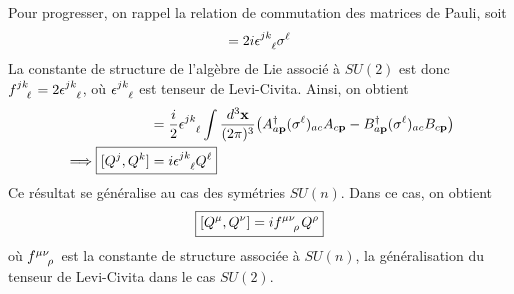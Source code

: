 \documentclass{article}
\numberwithin{equation}{section}
\begin{document}
Pour  progresser, on rappel la relation de commutation des matrices de Pauli, soit
\begin{equation}
        [\sigma^{j}, \sigma^{k}] = 2i \epsilon\indices{^{jk}_{\ell}} \sigma^{\ell}
\end{equation} 
La constante de structure de l'algèbre de Lie associé à $SU(2)$ est donc $f\indices{^{jk}_{\ell}} = 2 \epsilon\indices{^{jk}_{\ell}}$, où $\epsilon\indices{^{jk}_{\ell}}$ est tenseur de Levi-Civita. 
Ainsi, on obtient
\begin{align*}
        [Q^{j}, Q^{k}]        
&= \frac{i}{2}\epsilon\indices{^{jk}_{\ell}}\int \frac{d^{3}\mathbf{x}}{(2\pi)^{3}} 
\big( A^{\dagger}_{a\mathbf{p}} (\sigma^{\ell})_{ac} A_{c \mathbf{p}} 
- B^{\dagger}_{a\mathbf{p}} (\sigma^{\ell})_{ac} B_{c \mathbf{p}} 
\big) \\
        \implies \Aboxed{[Q^{j}, Q^{k}] &= i \epsilon\indices{^{jk}_{\ell}}Q^{\ell}}
\end{align*}
Ce résultat se généralise au cas des symétries $SU(n)$. Dans ce cas, on obtient
\begin{equation}
        \boxed{ [Q^{\mu}, Q^{\nu}] = if\indices{^{\mu \nu}_{\rho}}Q^{\rho} }
\end{equation} 
où $f\indices{^{\mu \nu}_{\rho}}$ est la constante de structure associée à $SU(n)$, la généralisation du tenseur de Levi-Civita dans le cas $SU(2)$.
\end{document}

